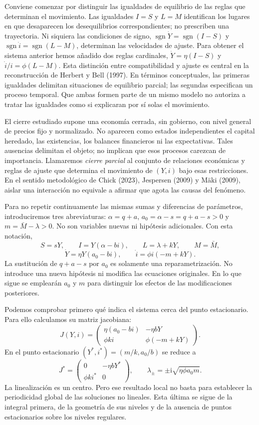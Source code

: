 \documentclass[10.5pt,twoside]{article}
\begin{document}
Conviene comenzar por distinguir las igualdades de equilibrio de las reglas que determinan el movimiento. Las igualdades $I=S$ y $L=M$ identifican los lugares en que desaparecen los desequilibrios correspondientes; no prescriben una trayectoria. Ni siquiera las condiciones de signo, $\operatorname{sgn}\dot Y=\operatorname{sgn}(I-S)$ y $\operatorname{sgn}\dot i=\operatorname{sgn}(L-M)$, determinan las velocidades de ajuste. Para obtener el sistema anterior hemos añadido dos reglas cardinales, $\dot Y=\eta(I-S)$ y $\dot i/i=\phi(L-M)$. Esta distinción entre compatibilidad y ajuste es central en la reconstrucción de Herbert y Bell (1997). En términos conceptuales, las primeras igualdades delimitan situaciones de equilibrio parcial; las segundas especifican un proceso temporal. Que ambas formen parte de un mismo modelo no autoriza a tratar las igualdades como si explicaran por sí solas el movimiento.

El cierre estudiado supone una economía cerrada, sin gobierno, con nivel general de precios fijo y normalizado. No aparecen como estados independientes el capital heredado, las existencias, los balances financieros ni las expectativas. Tales ausencias delimitan el objeto; no implican que esos procesos carezcan de importancia. Llamaremos \emph{cierre parcial} al conjunto de relaciones económicas y reglas de ajuste que determina el movimiento de $(Y,i)$ bajo esas restricciones. En el sentido metodológico de Chick (2023), Jespersen (2009) y Mäki (2009), aislar una interacción no equivale a afirmar que agota las causas del fenómeno.

Para no repetir continuamente las mismas sumas y diferencias de parámetros, introduciremos tres abreviaturas: $\alpha=q+a$, $a_0=\alpha-s=q+a-s>0$ y $m=\bar M-\lambda>0$. No son variables nuevas ni hipótesis adicionales. Con esta notación,
\[
 S=sY,\qquad I=Y(\alpha-bi),\qquad L=\lambda+kY,\qquad M=\bar M,
\]
\[
 \dot Y=\eta Y(a_0-bi),\qquad \dot i=\phi i(-m+kY).
\]
La sustitución de $q+a-s$ por $a_0$ es solamente una reparametrización. No introduce una nueva hipótesis ni modifica las ecuaciones originales. En lo que sigue se emplearán $a_0$ y $m$ para distinguir los efectos de las modificaciones posteriores.

Podemos comprobar primero qué indica el sistema cerca del punto estacionario. Para ello calculamos su matriz jacobiana:
\[
 J(Y,i)=\begin{pmatrix}
 \eta(a_0-bi)&-\eta bY\\
 \phi ki&\phi(-m+kY)
 \end{pmatrix}.
\]
En el punto estacionario $(Y^*,i^*)=(m/k,a_0/b)$ se reduce a
\[
 J^*=\begin{pmatrix}0&-\eta bY^*\\ \phi ki^*&0\end{pmatrix},
 \qquad \lambda_{\pm}=\pm\mathrm{i}\sqrt{\eta\phi a_0m}.
\]
La linealización es un centro. Pero ese resultado local no basta para establecer la periodicidad global de las soluciones no lineales. Esta última se sigue de la integral primera, de la geometría de sus niveles y de la ausencia de puntos estacionarios sobre los niveles regulares.
\end{document}
